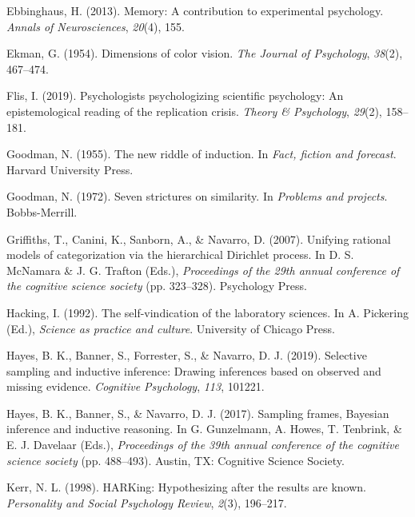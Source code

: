 \documentclass[
  english,
  doc]{apa6}
\begin{document}
\leavevmode\hypertarget{ref-ebbinghaus2013memory}{}%
Ebbinghaus, H. (2013). Memory: A contribution to experimental psychology. \emph{Annals of Neurosciences}, \emph{20}(4), 155.

\leavevmode\hypertarget{ref-ekman1954dimensions}{}%
Ekman, G. (1954). Dimensions of color vision. \emph{The Journal of Psychology}, \emph{38}(2), 467--474.

\leavevmode\hypertarget{ref-Flis2019}{}%
Flis, I. (2019). Psychologists psychologizing scientific psychology: An epistemological reading of the replication crisis. \emph{Theory \& Psychology}, \emph{29}(2), 158--181.

\leavevmode\hypertarget{ref-goodman1955new}{}%
Goodman, N. (1955). The new riddle of induction. In \emph{Fact, fiction and forecast}. Harvard University Press.

\leavevmode\hypertarget{ref-goodman1972seven}{}%
Goodman, N. (1972). Seven strictures on similarity. In \emph{Problems and projects}. Bobbs-Merrill.

\leavevmode\hypertarget{ref-griffiths2007unifying}{}%
Griffiths, T., Canini, K., Sanborn, A., \& Navarro, D. (2007). Unifying rational models of categorization via the hierarchical Dirichlet process. In D. S. McNamara \& J. G. Trafton (Eds.), \emph{Proceedings of the 29th annual conference of the cognitive science society} (pp. 323--328). Psychology Press.

\leavevmode\hypertarget{ref-hacking1992self}{}%
Hacking, I. (1992). The self-vindication of the laboratory sciences. In A. Pickering (Ed.), \emph{Science as practice and culture}. University of Chicago Press.

\leavevmode\hypertarget{ref-hayes2019selective}{}%
Hayes, B. K., Banner, S., Forrester, S., \& Navarro, D. J. (2019). Selective sampling and inductive inference: Drawing inferences based on observed and missing evidence. \emph{Cognitive Psychology}, \emph{113}, 101221.

\leavevmode\hypertarget{ref-hayes2017sampling}{}%
Hayes, B. K., Banner, S., \& Navarro, D. J. (2017). Sampling frames, Bayesian inference and inductive reasoning. In G. Gunzelmann, A. Howes, T. Tenbrink, \& E. J. Davelaar (Eds.), \emph{Proceedings of the 39th annual conference of the cognitive science society} (pp. 488--493). Austin, TX: Cognitive Science Society.

\leavevmode\hypertarget{ref-kerr1998harking}{}%
Kerr, N. L. (1998). HARKing: Hypothesizing after the results are known. \emph{Personality and Social Psychology Review}, \emph{2}(3), 196--217.
\end{document}

